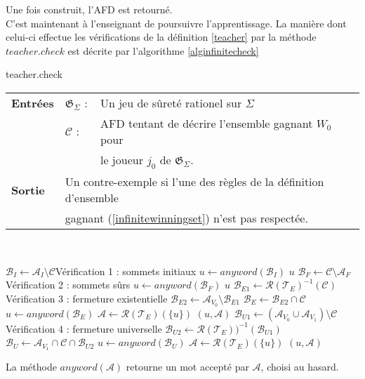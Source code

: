 \documentclass[12pt,a4paper,oneside,titlepage]{report}
\begin{document}
\noindent Une fois construit, l'AFD est retourné.\\

\noindent C'est maintenant à l'enseignant de poursuivre l'apprentissage.
La manière dont celui-ci effectue les vérifications de la définition \ref{teacher} par la méthode $teacher.check$ est décrite par l'algorithme \ref{alginfinitecheck}
\begin{algorithm}[H]
\caption{teacher.check}\label{alginfinitecheck}
\hspace*{\algorithmicindent} 
\begin{tabular}{lll}
	\textbf{Entrées} & \textbf{$\mathfrak{G}_\Sigma$} : &Un jeu de sûreté rationel sur $\Sigma$\\
	&\textbf{$\mathcal{C}$} : &AFD tentant de décrire l'ensemble gagnant $W_0$ pour\\
	&&le joueur $j_0$ de $\mathfrak{G}_\Sigma$.\\
	\textbf{Sortie} &\multicolumn{2}{l}{Un contre-exemple si l'une des règles de la définition d'ensemble}\\
	&\multicolumn{2}{l}{gagnant (\ref{infinitewinningset}) n'est pas respectée.}
\end{tabular}\\
\begin{algorithmic}[1]
\State $\mathcal{B}_I\gets\mathcal{A}_I\setminus\mathcal{C}$\Comment Vérification 1 : sommets initiaux 
	\State $u\gets anyword(\mathcal{B}_I)$
	\State\Return $u$
\EndIf
\State $\mathcal{B}_F\gets\mathcal{C}\setminus\mathcal{A}_F$\Comment Vérification 2 : sommets sûrs
	\State $u\gets anyword(\mathcal{B}_F)$
	\State\Return $u$
\EndIf
\State $\mathcal{B}_{E1}\gets\mathcal{R}(\mathcal{T}_E)^{-1}(\mathcal{C})$\Comment Vérification 3 : fermeture existentielle
\State $\mathcal{B}_{E2}\gets\mathcal{A}_{V_0}\setminus\mathcal{B}_{E1}$
\State $\mathcal{B}_E\gets\mathcal{B}_{E2}\cap\mathcal{C}$
	\State $u\gets anyword(\mathcal{B}_E)$
	\State $\mathcal{A}\gets\mathcal{R}(\mathcal{T}_E)(\{u\})$
	\State\Return $(u,\mathcal{A})$ 
\EndIf
\State $\mathcal{B}_{U1}\gets(\mathcal{A}_{V_0}\cup\mathcal{A}_{V_1})\setminus\mathcal{C}$\Comment Vérification 4 : fermeture universelle
\State $\mathcal{B}_{U2}\gets\mathcal{R}(\mathcal{T}_E))^{-1}(\mathcal{B}_{U1})$
\State $\mathcal{B}_U\gets\mathcal{A}_{V_1}\cap\mathcal{C}\cap\mathcal{B}_{U2}$
	\State $u\gets anyword(\mathcal{B}_U)$
	\State $\mathcal{A}\gets\mathcal{R}(\mathcal{T}_E)(\{u\})$
	\State\Return $(u,\mathcal{A})$ 
\EndIf
\end{algorithmic}
\end{algorithm}
\noindent La méthode $anyword(\mathcal{A})$ retourne un mot accepté par $\mathcal{A}$, choisi au hasard.\\
\end{document}
